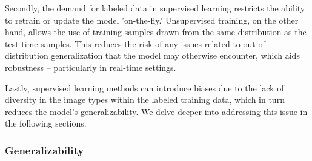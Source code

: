 \documentclass[sn-mathphys]{sn-jnl}%
\theoremstyle{thmstyleone}%
\theoremstyle{thmstyletwo}%
\theoremstyle{thmstylethree}%
\begin{document}
Secondly, the demand for labeled data in supervised learning restricts the ability to retrain or update the model 'on-the-fly.' Unsupervised training, on the other hand, allows the use of training samples drawn from the same distribution as the test-time samples. This reduces the risk of any issues related to out-of-distribution generalization that the model may otherwise encounter, which aids robustness -- particularly in real-time settings.

Lastly, supervised learning methods can introduce biases due to the lack of diversity in the image types within the labeled training data, which in turn reduces the model's generalizability. We delve deeper into addressing this issue in the following sections.


\subsubsection{Generalizability} \label{sec_generalization}
\end{document}
